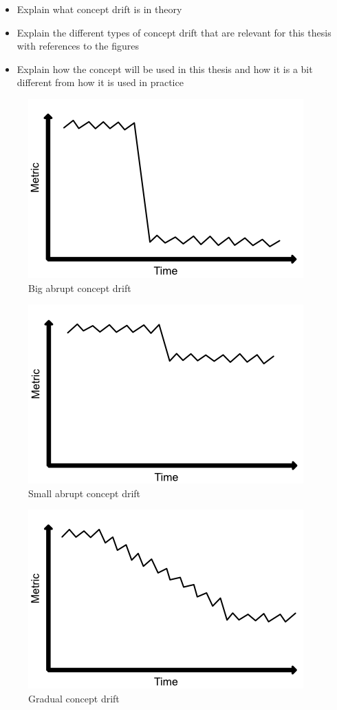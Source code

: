 \documentclass[12pt]{report}
\begin{document}
\begin{itemize}
    \item Explain what concept drift is in theory
    \item Explain the different types of concept drift that are relevant for this thesis with references to the figures
    \item Explain how the concept will be used in this thesis and how it is a bit different from how it is used in practice
\end{itemize}

\begin{figure}[ht!]
\centering
\includegraphics[width=0.6\linewidth]{assets/preliminaries/big-abrupt-drift.png}
\caption{Big abrupt concept drift}
\label{fig:big-abrupt-drift}
\end{figure}

\begin{figure}[ht!]
\centering
\includegraphics[width=0.6\linewidth]{assets/preliminaries/small-abrupt-drift.png}
\caption{Small abrupt concept drift}
\label{fig:small-abrupt-drift}
\end{figure}

\begin{figure}[ht!]
\centering
\includegraphics[width=0.6\linewidth]{assets/preliminaries/gradual-drift.png}
\caption{Gradual concept drift}
\label{fig:gradual-drift}
\end{figure}
\end{document}
